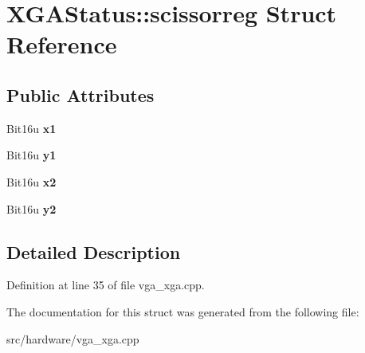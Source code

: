 \hypertarget{structXGAStatus_1_1scissorreg}{\section{X\-G\-A\-Status\-:\-:scissorreg Struct Reference}
\label{structXGAStatus_1_1scissorreg}
}
\subsection*{Public Attributes}
\begin{DoxyCompactItemize}
\item 
\hypertarget{structXGAStatus_1_1scissorreg_ad3e4ad28d22c2e077e8b3bacc98ebdb1}{Bit16u {\bfseries x1}}\label{structXGAStatus_1_1scissorreg_ad3e4ad28d22c2e077e8b3bacc98ebdb1}

\item 
\hypertarget{structXGAStatus_1_1scissorreg_a29e8108de5985b61a3f34f7222eb9036}{Bit16u {\bfseries y1}}\label{structXGAStatus_1_1scissorreg_a29e8108de5985b61a3f34f7222eb9036}

\item 
\hypertarget{structXGAStatus_1_1scissorreg_abf4e56ed7f20e1519d9845746061df2a}{Bit16u {\bfseries x2}}\label{structXGAStatus_1_1scissorreg_abf4e56ed7f20e1519d9845746061df2a}

\item 
\hypertarget{structXGAStatus_1_1scissorreg_a15dc194bb6bcecede56a3bd7c6ebf1c3}{Bit16u {\bfseries y2}}\label{structXGAStatus_1_1scissorreg_a15dc194bb6bcecede56a3bd7c6ebf1c3}

\end{DoxyCompactItemize}


\subsection{Detailed Description}


Definition at line 35 of file vga\-\_\-xga.\-cpp.



The documentation for this struct was generated from the following file\-:\begin{DoxyCompactItemize}
\item 
src/hardware/vga\-\_\-xga.\-cpp\end{DoxyCompactItemize}
